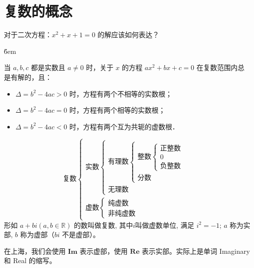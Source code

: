 \section{复数的概念}

\begin{review}
    对于二次方程：$x^2+x+1=0$ 的解应该如何表达？
\end{review}

\v{6em}

\begin{review}
    当 $a, b, c$ 都是实数且 $a \neq 0$ 时，关于 $x$ 的方程 $a x^2+b x+c=0$ 在复数范围内总是有解的，且：
    \begin{itemize}
        \item $\Delta=b^2-4 a c>0$ 时，方程有两个不相等的实数根；
        \item $\Delta=b^2-4 a c=0$ 时，方程有两个相等的实数根；
        \item $\Delta=b^2-4 a c<0$ 时，方程有两个互为共轭的虚数根．
    \end{itemize}
\end{review}

\begin{definition}[复数的概念]
    \[
        \text{复数}
        \begin{cases}
            \text{实数}
            \begin{cases}
                \text{有理数}
                \begin{cases}
                    \text{整数}
                    \begin{cases}
                        \text{正整数} \\
                        0          \\
                        \text{负整数}
                    \end{cases} \\
                    \text{分数}
                \end{cases} \\
                \text{无理数}
            \end{cases} \\
            \text{虚数}
            \begin{cases}
                \text{纯虚数} \\
                \text{非纯虚数}
            \end{cases}
        \end{cases}
    \]
    形如 $a+bi(a,b\in \mathbb{R})$ 的数叫做复数, 其中$i$叫做虚数单位, 满足 $i^{2}=-1$; $a$ 称为实部, $b$ 称为虚部（$bi$ 不是虚部）。
    \begin{tips}
        在上海，我们会使用 $\mathbf{Im}$ 表示虚部，使用 $\mathbf{Re}$ 表示实部。实际上是单词 Imaginary 和 Real 的缩写。
    \end{tips}
\end{definition}

